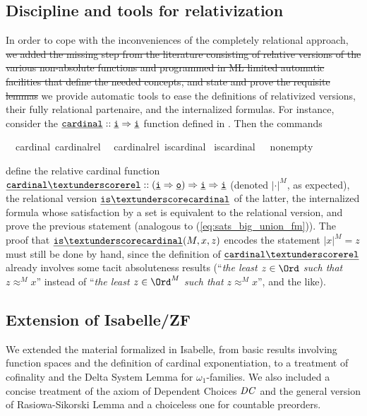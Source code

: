 \subsection{Discipline and tools for relativization}
\label{sec:tools-relativization}
In order to cope with the inconveniences of the completely relational approach, \sout{we added the missing step from the
literature consisting of relative versions of the various non-absolute
functions and programmed in ML limited automatic facilities that
define the needed concepts, and  state and
prove the requisite lemmas} we
provide automatic tools
to ease the definitions of relativized versions, their fully relational
partenaire, and the internalized formulas. For instance, consider the 
$\isatt{cardinal}::\tyi \fun \tyi$ function defined in
. Then the commands
\begin{isabelle}
  \isamarkupfalse%
  \ \ {\isachardoublequoteopen}cardinal{\isachardoublequoteclose}\ {\isachardoublequoteopen}cardinal{\isacharunderscore}{\kern0pt}rel{\isachardoublequoteclose}\ \isanewline
  \isamarkupfalse%
  \ {\isachardoublequoteopen}cardinal{\isacharunderscore}{\kern0pt}rel{\isachardoublequoteclose}\ {\isachardoublequoteopen}is{\isacharunderscore}{\kern0pt}cardinal{\isachardoublequoteclose}\isanewline
  \isamarkupfalse%
  \ {\isachardoublequoteopen}is{\isacharunderscore}{\kern0pt}cardinal{\isachardoublequoteclose}\ \ \ {\isachardoublequoteopen}nonempty{\isachardoublequoteclose}%
\end{isabelle}
define the relative cardinal function
$\isatt{cardinal{\uscore}rel}::(\tyi \fun \tyo) \fun \tyi \fun\tyi$
(denoted  $|\cdot|^M$, as expected),
the relational version $\isatt{is{\uscore}cardinal}$ of the latter, the
internalized formula  whose
satisfaction by a set is equivalent to the relational version, and
prove the previous statement (analogous to (\ref{eq:sats_big_union_fm})).
The proof that $\isatt{is{\uscore}cardinal}(M,x,z)$  encodes the
statement $|x|^M = z$ must still be done by hand, since the definition
of $\isatt{cardinal{\uscore}rel}$ already involves some tacit
absoluteness results (“\textit{the least $z \in \Ord$ such that $z
  \approx^M x$}” instead
of “\textit{the least $z \in \Ord^M$ such that $z
  \approx^M x$}”, and the like).

\subsection{Extension of Isabelle/ZF}
\label{sec:extension-isabellezf}
We extended \cite{Delta_System_Lemma-AFP} the material formalized in
Isabelle, from basic results involving function spaces and the
definition of cardinal exponentiation, to a treatment of cofinality
and the Delta System Lemma for $\omega_1$-families. We also included a
concise treatment of the axiom of Dependent Choices $\mathit{DC}$ and the
general version of Rasiowa-Sikorski Lemma \cite{2018arXiv180705174G}
and a choiceless one for countable preorders.

